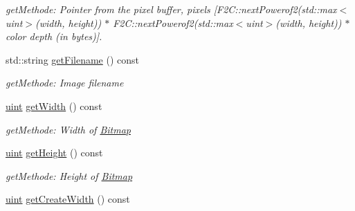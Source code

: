 \begin{DoxyCompactItemize}
\begin{DoxyCompactList}\small\item\em getMethode: Pointer from the pixel buffer, pixels \mbox{[}F2C::nextPowerof2(std::max$<$uint$>$(width, height)) $\ast$ F2C::nextPowerof2(std::max$<$uint$>$(width, height)) $\ast$ color depth (in bytes)\mbox{]}. \item\end{DoxyCompactList}\item 
\hypertarget{class_f2_c_1_1_bitmap_a8d488e4029c06490e5b1b101a92b21b4}{
std::string \hyperlink{class_f2_c_1_1_bitmap_a8d488e4029c06490e5b1b101a92b21b4}{getFilename} () const }
\label{class_f2_c_1_1_bitmap_a8d488e4029c06490e5b1b101a92b21b4}

\begin{DoxyCompactList}\small\item\em getMethode: Image filename \item\end{DoxyCompactList}\item 
\hypertarget{class_f2_c_1_1_bitmap_a456817554a26f545c06dd371841d9ac7}{
\hyperlink{namespace_f2_c_a58be2bac9eb3e3c99cb41b6008bf4fae}{uint} \hyperlink{class_f2_c_1_1_bitmap_a456817554a26f545c06dd371841d9ac7}{getWidth} () const }
\label{class_f2_c_1_1_bitmap_a456817554a26f545c06dd371841d9ac7}

\begin{DoxyCompactList}\small\item\em getMethode: Width of \hyperlink{class_f2_c_1_1_bitmap}{Bitmap} \item\end{DoxyCompactList}\item 
\hypertarget{class_f2_c_1_1_bitmap_aeb4fad0eefc40bc1ad59a94fa1496353}{
\hyperlink{namespace_f2_c_a58be2bac9eb3e3c99cb41b6008bf4fae}{uint} \hyperlink{class_f2_c_1_1_bitmap_aeb4fad0eefc40bc1ad59a94fa1496353}{getHeight} () const }
\label{class_f2_c_1_1_bitmap_aeb4fad0eefc40bc1ad59a94fa1496353}

\begin{DoxyCompactList}\small\item\em getMethode: Height of \hyperlink{class_f2_c_1_1_bitmap}{Bitmap} \item\end{DoxyCompactList}\item 
\hypertarget{class_f2_c_1_1_bitmap_a7cf28e3c9441ec8d593997eb325b884d}{
\hyperlink{namespace_f2_c_a58be2bac9eb3e3c99cb41b6008bf4fae}{uint} \hyperlink{class_f2_c_1_1_bitmap_a7cf28e3c9441ec8d593997eb325b884d}{getCreateWidth} () const }
\label{class_f2_c_1_1_bitmap_a7cf28e3c9441ec8d593997eb325b884d}


\end{DoxyCompactItemize}
